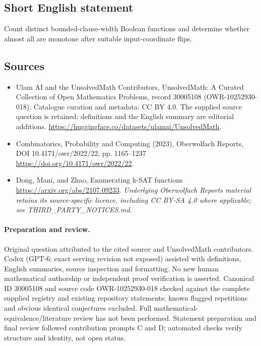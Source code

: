 \documentclass[11pt]{article}
\begin{document}
\subsection{Short English statement}
Count distinct bounded-clause-width Boolean functions and determine whether almost all are monotone after suitable input-coordinate flips.
\subsection{Sources}
\begin{itemize}
\item[\hypertarget{source:30005108:1}{S1}] Ulam AI and the UnsolvedMath Contributors, UnsolvedMath: A Curated Collection of Open Mathematics Problems, record 30005108 (OWR-10252930-018). Catalogue curation and metadata: CC BY 4.0. The supplied source question is retained; definitions and the English summary are editorial additions.
\url{https://huggingface.co/datasets/ulamai/UnsolvedMath}.
\item[\hypertarget{source:30005108:2}{S2}] Combinatorics, Probability and Computing (2023), Oberwolfach Reports, DOI 10.4171/owr/2022/22, pp. 1165--1237
\url{https://doi.org/10.4171/owr/2022/22}.
\item[\hypertarget{source:30005108:3}{S3}] Dong, Mani, and Zhao, Enumerating k-SAT functions
\url{https://arxiv.org/abs/2107.09233}.
\textit{Underlying Oberwolfach Reports material retains its source-specific licence, including CC BY-SA 4.0 where applicable; see THIRD\_PARTY\_NOTICES.md.}
\end{itemize}
\paragraph{Preparation and review.}
Original question attributed to the cited source and UnsolvedMath contributors. Codex (GPT-6; exact serving revision not exposed) assisted with definitions, English summaries, source inspection and formatting. No new human mathematical authorship or independent proof verification is asserted. Canonical ID 30005108 and source code OWR-10252930-018 checked against the complete supplied registry and existing repository statements; known flagged repetitions and obvious identical conjectures excluded. Full mathematical-equivalence/literature review has not been performed. Statement preparation and final review followed contribution prompts C and D; automated checks verify structure and identity, not open status.
\label{end:30005108}
\end{document}
